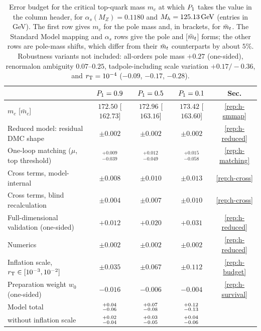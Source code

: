 \begin{table}[t]
\centering
\caption{Error budget for the critical top-quark mass $m_c$ at which $P_1$ takes the value in the column header, for $\alpha_s(M_Z)=0.1180$ and $M_h=125.13\,\mathrm{GeV}$ (entries in GeV). %
The first row gives $m_c$ for the pole mass and, in brackets, for $\bar m_t$.
The Standard Model mapping and $\alpha_s$ rows give the pole and [$\bar m_t$] forms; the other rows are pole-mass shifts, which differ from their $\bar m_t$ counterparts by about $5\%$. %
Robustness variants not included: all-orders pole mass $+0.27$ (one-sided), renormalon ambiguity $0.07$--$0.25$, tadpole-including scale variation $+0.17/-0.36$, and $r_{\mathrm{T}}=10^{-4}$ ($-0.09$, $-0.17$, $-0.28$).} %
\label{tab:rb-budget}
\small\setlength{\tabcolsep}{4pt}
\begin{tabular}{lcccc}
\toprule
 & $P_1=0.9$ & $P_1=0.5$ & $P_1=0.1$ & Sec. \\
\midrule
$m_c$ [$\bar m_c$] & $172.50$ [$162.73$] & $172.96$ [$163.16$] & $173.42$ [$163.60$] & \ref{rep:h-smmap} \\ %
Reduced model: residual DMC shape & $\pm0.002$ & $\pm0.002$ & $\pm0.002$ & \ref{rep:h-reduced} \\ %
One-loop matching ($\mu$, top threshold) & $^{+0.009}_{-0.039}$ & $^{+0.012}_{-0.049}$ & $^{+0.015}_{-0.058}$ & \ref{rep:h-matching} \\ %
Cross terms, model-internal & $\pm0.008$ & $\pm0.010$ & $\pm0.013$ & \ref{rep:h-cross} \\ %
Cross terms, blind recalculation & $\pm0.004$ & $\pm0.007$ & $\pm0.010$ & \ref{rep:h-cross} \\ %
Full-dimensional validation (one-sided) & $+0.012$ & $+0.020$ & $+0.031$ & \ref{rep:h-reduced} \\ %
Numerics & $\pm0.002$ & $\pm0.002$ & $\pm0.002$ & \ref{rep:h-reduced} \\ %
Inflation scale, $r_{\mathrm{T}}\in[10^{-3},10^{-2}]$ & $\pm0.035$ & $\pm0.067$ & $\pm0.112$ & \ref{rep:h-budget} \\ %
Preparation weight $w_0$ (one-sided) & $-0.016$ & $-0.006$ & $-0.004$ & \ref{rep:h-survival} \\ %
Model total & $^{+0.04}_{-0.06}$ & $^{+0.07}_{-0.08}$ & $^{+0.12}_{-0.13}$ & \\[2pt] %
\quad without inflation scale & $^{+0.02}_{-0.04}$ & $^{+0.03}_{-0.05}$ & $^{+0.04}_{-0.06}$ & \\[2pt] %

\end{tabular}
\end{table}
